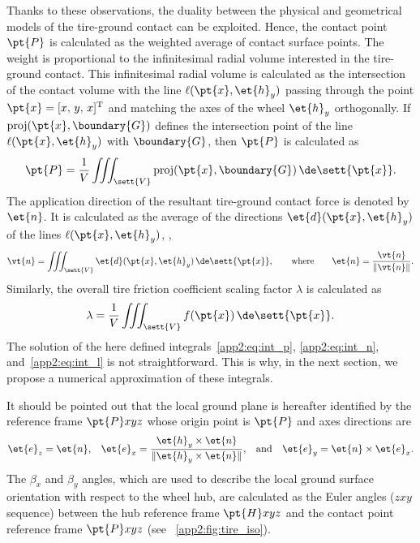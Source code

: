 Thanks to these observations, the duality between the physical and geometrical models of the tire-ground contact can be exploited. Hence, the contact point $\pt{P}$ is calculated as the weighted average of contact surface points. The weight is proportional to the infinitesimal radial volume interested in the tire-ground contact. This infinitesimal radial volume is calculated as the intersection of the contact volume with the line $\ell(\pt{x},\et{h}_y)$ passing through the point $\pt{x} = [x, \, y, \, x]^\mathrm{T}$ and matching the axes of the wheel $\et{h}_y$ orthogonally. If $\mathrm{proj}(\pt{x},\boundary{G})$ defines the intersection point of the line $\ell(\pt{x},\et{h}_y)$ with $\boundary{G}$, then $\pt{P}$ is calculated as
%
\begin{equation}
  \pt{P} = \dfrac{1}{V} \displaystyle\iiint_\sett{V} \mathrm{proj}(\pt{x},\boundary{G}) \, \de\sett{\pt{x}}
  \text{.}
  \label{app2:eq:int_p}
\end{equation}
%
The application direction of the resultant tire-ground contact force is denoted by $\et{n}$. It is calculated as the average of the directions $\et{d}(\pt{x},\et{h}_y)$ of the lines $\ell(\pt{x},\et{h}_y)$, \ie{},
%
\begin{equation}
  \vt{n} = \displaystyle\iiint_\sett{V} \et{d}(\pt{x},\et{h}_y) \, \de\sett{\pt{x}},
  \qquad \text{where} \qquad
  \et{n} = \dfrac{\vt{n}}{\|\vt{n}\|}
  \text{.}
  \label{app2:eq:int_n}
\end{equation}
%
Similarly, the overall tire friction coefficient scaling factor $\lambda$ is calculated as
%
\begin{equation}
  \lambda = \dfrac{1}{V} \displaystyle\iiint_\sett{V} f(\pt{x}) \, \de\sett{\pt{x}}
  \text{.}
  \label{app2:eq:int_l}
\end{equation}
%
The solution of the here defined integrals~\eqref{app2:eq:int_p}, \eqref{app2:eq:int_n}, and~\eqref{app2:eq:int_l} is not straightforward. This is why, in the next section, we propose a numerical approximation of these integrals.

It should be pointed out that the local ground plane is hereafter identified by the reference frame $\pt{P}xyz$ whose origin point is $\pt{P}$ and axes directions are
%
\begin{align*}
  \et{e}_z = \et{n}\text{,} \quad
  \et{e}_x = \dfrac{\et{h}_y \times \et{n}}{\|\et{h}_y \times \et{n}\|}\text{,} \quad \text{and} \quad
  \et{e}_y = \et{n} \times \et{e}_x
  \text{.}
\end{align*}
%
The $\beta_x$ and $\beta_y$ angles, which are used to describe the local ground surface orientation with respect to the wheel hub, are calculated as the Euler angles ($zxy$ sequence) between the hub reference frame $\pt{H}xyz$ and the contact point reference frame $\pt{P}xyz$ (see \figurename{}~\ref{app2:fig:tire_iso}).

